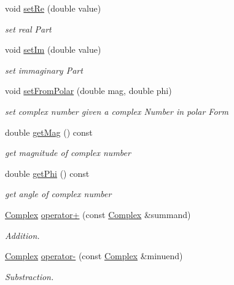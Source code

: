 \begin{DoxyCompactItemize}
void \mbox{\hyperlink{class_complex_af92157b54776656aea634edd4ecac46d}{set\+Re}} (double value)
\begin{DoxyCompactList}\small\item\em set real Part \end{DoxyCompactList}\item 
void \mbox{\hyperlink{class_complex_a6bc88eb16ce2cf081ad0d6c0c5758f11}{set\+Im}} (double value)
\begin{DoxyCompactList}\small\item\em set immaginary Part \end{DoxyCompactList}\item 
void \mbox{\hyperlink{class_complex_a507be49e963cbeab282f9c839a0eea40}{set\+From\+Polar}} (double mag, double phi)
\begin{DoxyCompactList}\small\item\em set complex number given a complex Number in polar Form \end{DoxyCompactList}\item 
double \mbox{\hyperlink{class_complex_a58e5404efd8f49c034be2ab82af53461}{get\+Mag}} () const
\begin{DoxyCompactList}\small\item\em get magnitude of complex number \end{DoxyCompactList}\item 
double \mbox{\hyperlink{class_complex_a4eb4ecde5a206cae05fd0b6500f22fff}{get\+Phi}} () const
\begin{DoxyCompactList}\small\item\em get angle of complex number \end{DoxyCompactList}\item 
\mbox{\hyperlink{class_complex}{Complex}} \mbox{\hyperlink{class_complex_a4c1189414fa16c6d8115c90ce2f29d78}{operator+}} (const \mbox{\hyperlink{class_complex}{Complex}} \&summand)
\begin{DoxyCompactList}\small\item\em Addition. \end{DoxyCompactList}\item 
\mbox{\hyperlink{class_complex}{Complex}} \mbox{\hyperlink{class_complex_a8f880f1056308d876fd50aad9244e8d2}{operator-\/}} (const \mbox{\hyperlink{class_complex}{Complex}} \&minuend)
\begin{DoxyCompactList}\small\item\em Substraction. \end{DoxyCompactList}\item 

\end{DoxyCompactItemize}
